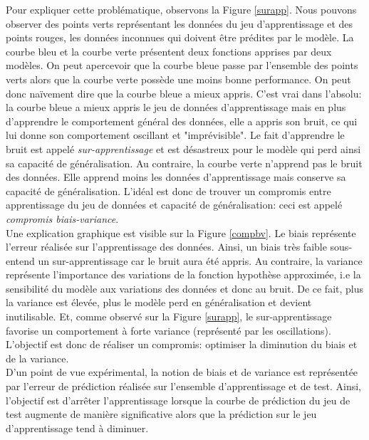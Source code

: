 \noindent Pour expliquer cette problématique, observons la Figure \ref{surapp}. Nous pouvons observer des points verts représentant les données du jeu d'apprentissage et des points rouges, les données inconnues qui doivent être prédites par le modèle. La courbe bleu et la courbe verte présentent deux fonctions apprises par deux modèles. On peut apercevoir que la courbe bleue passe par l'ensemble des points verts alors que la courbe verte possède une moins bonne performance. On peut donc naïvement dire que la courbe bleue a mieux appris. C'est vrai dans l'absolu: la courbe bleue a mieux appris le jeu de données d'apprentissage mais en plus d'apprendre le comportement général des données, elle a appris son bruit, ce qui lui donne son comportement oscillant et "imprévisible". Le fait d'apprendre le bruit est appelé \textit{sur-apprentissage} et est désastreux pour le modèle qui perd ainsi sa capacité de généralisation. Au contraire, la courbe verte n'apprend pas le bruit des données. Elle apprend moins les données d'apprentissage mais conserve sa capacité de généralisation. L'idéal est donc de trouver un compromis entre apprentissage du jeu de données et capacité de généralisation: ceci est appelé \textit{compromis biais-variance}.\\

\noindent Une explication graphique est visible sur la Figure \ref{compbv}. Le biais représente l'erreur réalisée sur l'apprentissage des données. Ainsi, un biais très faible sous-entend un sur-apprentissage car le bruit aura été appris. Au contraire, la variance représente l'importance des variations de la fonction hypothèse approximée, i.e la sensibilité du modèle aux variations des données et donc au bruit. De ce fait, plus la variance est élevée, plus le modèle perd en généralisation et devient inutilisable. Et, comme observé sur la Figure \ref{surapp}, le sur-apprentissage favorise un comportement à forte variance (représenté par les oscillations). L'objectif est donc de réaliser un compromis: optimiser la diminution du biais et de la variance.\\

\noindent D'un point de vue expérimental, la notion de biais et de variance est représentée par l'erreur de prédiction réalisée sur l'ensemble d'apprentissage et de test. Ainsi, l'objectif est d'arrêter l'apprentissage lorsque la courbe de prédiction du jeu de test augmente de manière significative alors que la prédiction sur le jeu d'apprentissage tend à diminuer.\\

